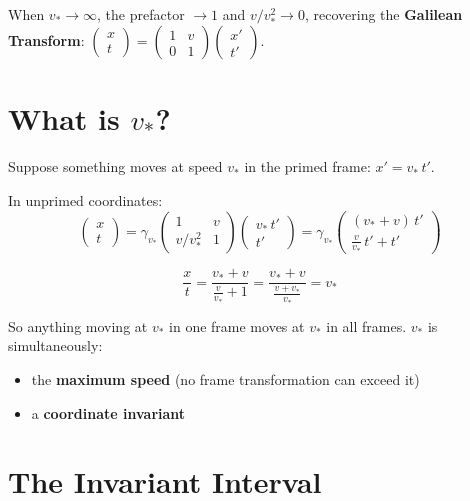 When $v_*\to\infty$, the prefactor $\to 1$ and $v/v_*^2 \to 0$, recovering the
\textbf{Galilean Transform}:
$\begin{pmatrix}x\\t\end{pmatrix} = \begin{pmatrix}1&v\\0&1\end{pmatrix}\begin{pmatrix}x'\\t'\end{pmatrix}$.

\section*{What is $v_*$?}

Suppose something moves at speed $v_*$ in the primed frame: $x' = v_*\, t'$.

In unprimed coordinates:
\[
  \begin{pmatrix}x\\t\end{pmatrix}
  = \gamma_{v_*}\begin{pmatrix}1&v\\[4pt]v/v_*^2&1\end{pmatrix}
    \begin{pmatrix}v_*\,t'\\t'\end{pmatrix}
  = \gamma_{v_*}\begin{pmatrix}(v_*+v)\,t'\\[4pt]\frac{v}{v_*}\,t'+t'\end{pmatrix}
\]

\[
  \frac{x}{t} = \frac{v_*+v}{\frac{v}{v_*}+1}
              = \frac{v_*+v}{\frac{v+v_*}{v_*}}
              = v_*
\]

So anything moving at $v_*$ in one frame moves at $v_*$ in all frames.
$v_*$ is simultaneously:
\begin{itemize}
  \item the \textbf{maximum speed} (no frame transformation can exceed it)
  \item a \textbf{coordinate invariant}
\end{itemize}

\section*{The Invariant Interval}

